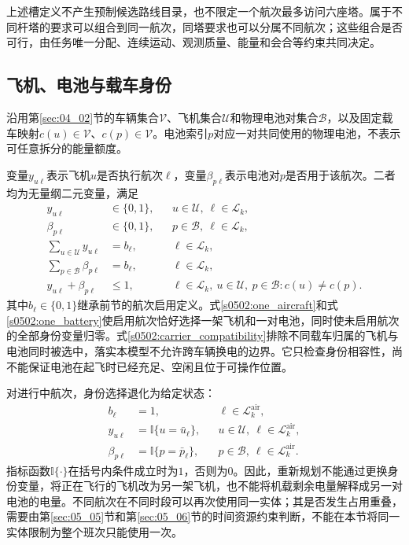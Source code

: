 上述槽定义不产生预制候选路线目录，也不限定一个航次最多访问六座塔。属于不同杆塔的要求可以组合到同一航次，同塔要求也可以分属不同航次；这些组合是否可行，由任务唯一分配、连续运动、观测质量、能量和会合等约束共同决定。

\subsection{飞机、电池与载车身份}

沿用第\ref{sec:04_02}节的车辆集合$\mathcal V$、飞机集合$\mathcal U$和物理电池对集合$\mathcal B$，以及固定载车映射$c(u)\in\mathcal V$、$c(p)\in\mathcal V$。电池索引$p$对应一对共同使用的物理电池，不表示可任意拆分的能量额度。

变量$y_{u\ell}$表示飞机$u$是否执行航次$\ell$，变量$\beta_{p\ell}$表示电池对$p$是否用于该航次。二者均为无量纲二元变量，满足
\begin{align}
 y_{u\ell}&\in\{0,1\},
 &&u\in\mathcal U,\ \ell\in\mathcal L_k,
 \label{s0502:aircraft_domain}\\
 \beta_{p\ell}&\in\{0,1\},
 &&p\in\mathcal B,\ \ell\in\mathcal L_k,
 \label{s0502:battery_domain}\\
 \sum_{u\in\mathcal U}y_{u\ell}&=b_\ell,
 &&\ell\in\mathcal L_k,
 \label{s0502:one_aircraft}\\
 \sum_{p\in\mathcal B}\beta_{p\ell}&=b_\ell,
 &&\ell\in\mathcal L_k,
 \label{s0502:one_battery}\\
 y_{u\ell}+\beta_{p\ell}&\le1,
 &&\ell\in\mathcal L_k,\ u\in\mathcal U,\ p\in\mathcal B:
 c(u)\ne c(p).
 \label{s0502:carrier_compatibility}
\end{align}
其中$b_\ell\in\{0,1\}$继承前节的航次启用定义。式\eqref{s0502:one_aircraft}和式\eqref{s0502:one_battery}使启用航次恰好选择一架飞机和一对电池，同时使未启用航次的全部身份变量归零。式\eqref{s0502:carrier_compatibility}排除不同载车归属的飞机与电池同时被选中，落实本模型不允许跨车辆换电的边界。它只检查身份相容性，尚不能保证电池在起飞时已经充足、空闲且位于可操作位置。

对进行中航次，身份选择退化为给定状态：
\begin{align}
 b_\ell&=1,
 &&\ell\in\mathcal L_k^{\mathrm{air}},
 \label{s0502:ongoing_active}\\
 y_{u\ell}&=\mathbb I\{u=\bar u_\ell\},
 &&u\in\mathcal U,\ \ell\in\mathcal L_k^{\mathrm{air}},
 \label{s0502:ongoing_aircraft}\\
 \beta_{p\ell}&=\mathbb I\{p=\bar p_\ell\},
 &&p\in\mathcal B,\ \ell\in\mathcal L_k^{\mathrm{air}}.
 \label{s0502:ongoing_battery}
\end{align}
指标函数$\mathbb I\{\cdot\}$在括号内条件成立时为$1$，否则为$0$。因此，重新规划不能通过更换身份变量，将正在飞行的飞机改为另一架飞机，也不能将机载剩余电量解释成另一对电池的电量。不同航次在不同时段可以再次使用同一实体；其是否发生占用重叠，需要由第\ref{sec:05_05}节和第\ref{sec:05_06}节的时间资源约束判断，不能在本节将同一实体限制为整个班次只能使用一次。

